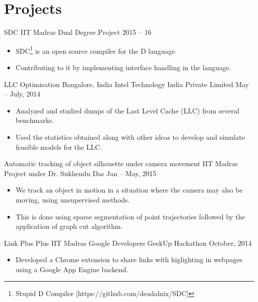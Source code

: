 \documentclass[letterpaper,11pt]{resume}
\begin{document}
\section{Projects}
\begin{itemize}
     \credential
    {{SDC}}
    {IIT Madras}
    {Dual Degree Project}
    {2015 -- 16}
    {
     \begin{itemize}
     \item SDC\footnote{Stupid D Compiler [https://github.com/deadalnix/SDC]} is an open source compiler for the D language.
     \item Contributing to it by implementing interface handling in the language.
     \end{itemize}

    }
   
   \credential
    {{LLC Optimisation}}
    {Bangalore, India}
    {Intel Technology India Private Limited}
    {May -- July, 2014}
    {
     \begin{itemize}
      \item Analyzed and studied dumps of the Last Level Cache (LLC) from several benchmarks. 
      \item Used the statistics obtained along with other ideas to develop and simulate feasible models for the LLC.
     \end{itemize}

    }
   
   \credential
    {Automatic tracking of object silhouette under camera movement}
    {IIT Madras}
    {Project under Dr. Sukhendu Das}
    {Jan -- May, 2015}
    {
     \begin{itemize}
      \item We track an object in motion in a situation where the camera may also be moving, using unsupervised methods.
      \item This is done using sparse segmentation of point trajectories followed by the application of graph cut algorithm.
     \end{itemize}

    }
   
   
   
   \credential
    {{Link Plus Plus}}
    {IIT Madras}
    {Google Developers GeekUp Hackathon}
    {October, 2014}
    {
     \begin{itemize}
      \item Developed a Chrome extension to share links with higlighting in webpages using a Google App Engine backend.
     \end{itemize}

}
\end{itemize}
\end{document}
